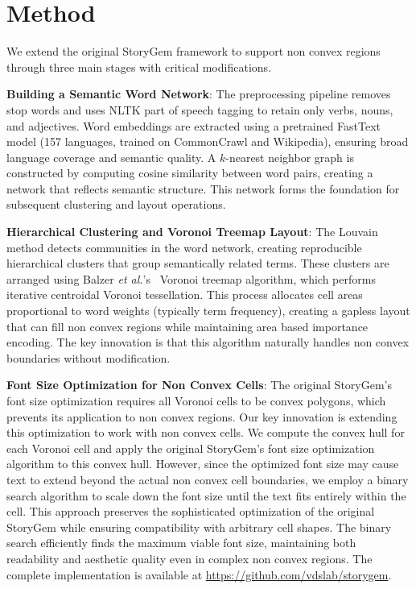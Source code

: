 \documentclass{vgtc}                          %
\newcommand{\etal}{\textit{et al.}}
\begin{document}
\section{Method}

We extend the original StoryGem framework to support non convex regions through three main stages with critical modifications.

\textbf{Building a Semantic Word Network}:
The preprocessing pipeline removes stop words and uses NLTK part of speech tagging to retain only verbs, nouns, and adjectives.
Word embeddings are extracted using a pretrained FastText model (157 languages, trained on CommonCrawl and Wikipedia), ensuring broad language coverage and semantic quality.
A $k$-nearest neighbor graph is constructed by computing cosine similarity between word pairs, creating a network that reflects semantic structure.
This network forms the foundation for subsequent clustering and layout operations.

\textbf{Hierarchical Clustering and Voronoi Treemap Layout}:
The Louvain method detects communities in the word network, creating reproducible hierarchical clusters that group semantically related terms.
These clusters are arranged using Balzer \etal's~\cite{balzer2005voronoi} Voronoi treemap algorithm, which performs iterative centroidal Voronoi tessellation.
This process allocates cell areas proportional to word weights (typically term frequency), creating a gapless layout that can fill non convex regions while maintaining area based importance encoding.
The key innovation is that this algorithm naturally handles non convex boundaries without modification.

\textbf{Font Size Optimization for Non Convex Cells}:
The original StoryGem's font size optimization requires all Voronoi cells to be convex polygons, which prevents its application to non convex regions.
Our key innovation is extending this optimization to work with non convex cells.
We compute the convex hull for each Voronoi cell and apply the original StoryGem's font size optimization algorithm to this convex hull.
However, since the optimized font size may cause text to extend beyond the actual non convex cell boundaries, we employ a binary search algorithm to scale down the font size until the text fits entirely within the cell.
This approach preserves the sophisticated optimization of the original StoryGem while ensuring compatibility with arbitrary cell shapes.
The binary search efficiently finds the maximum viable font size, maintaining both readability and aesthetic quality even in complex non convex regions.
The complete implementation is available at \url{https://github.com/vdslab/storygem}.
\end{document}
